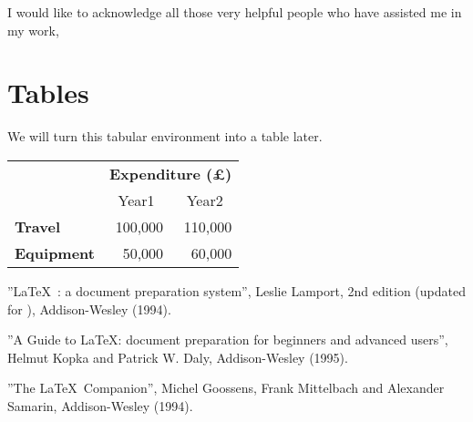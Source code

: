 \documentclass[12pt, bibliography=totoc]{scrreprt}
\begin{document}
I would like to acknowledge all those
very helpful people who have assisted me in my work,

\appendix

\chapter{Tables}
We will turn this tabular environment into a table later.

\begin{tabular}{lrr}
                     & \multicolumn{2}{c}{\bfseries Expenditure (\pounds)} \\
                     & \multicolumn{1}{c}{Year1} & \multicolumn{1}{c}{Year2} \\
 \bfseries Travel    & 100,000 & 110,000 \\
 \bfseries Equipment & 50,000  & 60,000
\end{tabular}

\begin{thebibliography}{Goossens 1994}
     ''\LaTeX\ : a document preparation system'',
    Leslie Lamport, 2nd edition (updated for \LaTeXe), Addison-Wesley (1994).

     ''A Guide to \LaTeX: document preparation for
    beginners and advanced users'', Helmut Kopka and Patrick W. Daly, 
    Addison-Wesley (1995).

     ''The \LaTeX\ Companion'', Michel Goossens,
    Frank Mittelbach and Alexander Samarin, Addison-Wesley (1994).
\end{thebibliography}
\end{document}
